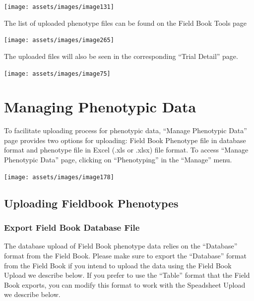 \documentclass[
  12pt,
]{book}
\begin{document}
\begin{center}\texttt{[image: assets/images/image131]} \end{center}

The list of uploaded phenotype files can be found on the Field Book Tools page

\begin{center}\texttt{[image: assets/images/image265]} \end{center}

The uploaded files will also be seen in the corresponding ``Trial Detail'' page.

\begin{center}\texttt{[image: assets/images/image75]} \end{center}

\hypertarget{managing-phenotypic-data}{%
\chapter{Managing Phenotypic Data}\label{managing-phenotypic-data}}

To facilitate uploading process for phenotypic data, ``Manage Phenotypic Data'' page provides two options for uploading: Field Book Phenotype file in database format and phenotype file in Excel (.xls or .xlsx) file format. To access ``Manage Phenotypic Data'' page, clicking on ``Phenotyping'' in the ``Manage'' menu.

\begin{center}\texttt{[image: assets/images/image178]} \end{center}

\hypertarget{uploading-fieldbook-phenotypes}{%
\section{Uploading Fieldbook Phenotypes}\label{uploading-fieldbook-phenotypes}}

\hypertarget{export-field-book-database-file}{%
\subsection{Export Field Book Database File}\label{export-field-book-database-file}}

The database upload of Field Book phenotype data relies on the ``Database'' format from the Field Book. Please make sure to export the ``Database'' format from the Field Book if you intend to upload the data using the Field Book Upload we describe below. If you prefer to use the ``Table'' format that the Field Book exports, you can modify this format to work with the Speadsheet Upload we describe below.
\end{document}
